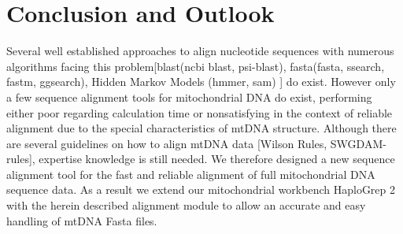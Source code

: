 \section{Conclusion and Outlook}
Several well established approaches to align nucleotide sequences with numerous algorithms facing this problem[blast(ncbi blast, psi-blast), fasta(fasta, ssearch, fastm, ggsearch), Hidden Markov Models (hmmer, sam) ] do exist. However only a few sequence alignment tools for mitochondrial DNA do exist, performing either poor regarding calculation time or nonsatisfying in the context of reliable alignment due to the special characteristics of mtDNA structure. Although there are several guidelines on how to align mtDNA data [Wilson Rules, SWGDAM-rules], expertise knowledge is still needed. We therefore designed a new sequence alignment tool for the fast and reliable alignment of full mitochondrial DNA sequence data. As a result we extend our mitochondrial workbench HaploGrep 2 with the herein described alignment module to allow an accurate and easy handling of mtDNA Fasta files.




